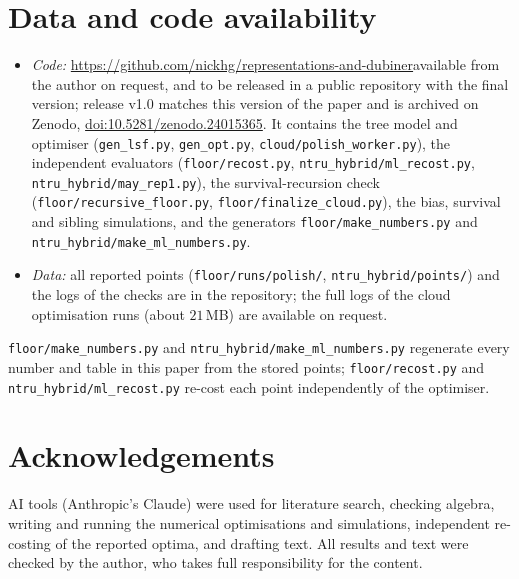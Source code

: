 \documentclass[11pt]{article}
\theoremstyle{definition}
\theoremstyle{remark}
\newif\ifanonymous \anonymousfalse    %
\newif\ifincludemeetlwe \includemeetlwetrue  %
\newcommand{\repourl}{https://github.com/nickhg/representations-and-dubiner}   %
\newif\ifpublicrepo \publicrepotrue    %
\newif\ifrelease \releasetrue    %
\newcommand{\reporelease}{v1.0}
\newcommand{\repodoi}{10.5281/zenodo.24015365}  %
\begin{document}
\section*{Data and code availability}
\begin{itemize}\sloppy\raggedright
\item \emph{Code:} \ifanonymous an anonymised repository is available to the reviewers\else\ifpublicrepo
  \url{\repourl}\else available from the author on request, and to be released in a public repository with the
  final version\fi\ifrelease; release \reporelease{} matches this version of the paper and is archived on Zenodo,
  \href{https://doi.org/\repodoi}{doi:\repodoi}\fi\fi. It contains the tree model and optimiser
  (\texttt{gen\_lsf.py}, \texttt{gen\_opt.py}, \texttt{cloud/polish\_worker.py}), the independent evaluators
  (\texttt{floor/recost.py}\ifincludemeetlwe, \texttt{ntru\_hybrid/ml\_recost.py}, \texttt{ntru\_hybrid/may\_rep1.py}\fi),
  the survival-recursion check (\texttt{floor/recursive\_floor.py}, \texttt{floor/finalize\_cloud.py}), the bias,
  survival and sibling simulations, and the generators \texttt{floor/make\_numbers.py}\ifincludemeetlwe{} and
  \texttt{ntru\_hybrid/make\_ml\_numbers.py}\fi.
\item \emph{Data:} all reported points (\texttt{floor/runs/polish/}\ifincludemeetlwe, \texttt{ntru\_hybrid/points/}\fi)
  and the logs of the checks are in the repository; the
  full logs of the cloud optimisation runs (about $21$\,MB) are available on request.
\end{itemize}
\texttt{floor/make\_numbers.py}\ifincludemeetlwe{} and \texttt{ntru\_hybrid/make\_ml\_numbers.py}\fi{} regenerate
every number and table in this paper from the stored points; \texttt{floor/recost.py}\ifincludemeetlwe{} and
\texttt{ntru\_hybrid/ml\_recost.py}\fi{} re-cost each point independently of the optimiser.

\section*{Acknowledgements}
AI tools (Anthropic's Claude) were used for literature search, checking algebra, writing and running the numerical
optimisations and simulations, independent re-costing of the reported optima, and drafting text. All results and text
were checked by the author, who takes full responsibility for the content.
\end{document}
